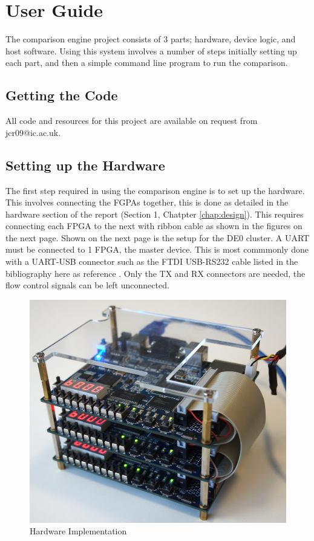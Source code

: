 \renewcommand{\baselinestretch}{1.5}
\chapter{User Guide}
\label{App:UserGuide}

The comparison engine project consists of 3 parts; hardware, device logic, and host software. Using this system involves a number of steps initially setting up each part, and then a simple command line program to run the comparison.

\section{Getting the Code}
All code and resources for this project are available on request from jcr09@ic.ac.uk.

\section{Setting up the Hardware}

The first step required in using the comparison engine is to set up the hardware. This involves connecting the FGPAs together, this is done as detailed in the hardware section of the report (Section 1, Chatpter \ref{chap:design}). This requires connecting each FPGA to the next with ribbon cable as shown in the figures on the next page. Shown on the next page is the setup for the DE0 cluster. A UART must be connected to 1 FPGA, the master device. This is most commmonly done with a UART-USB connector such as the FTDI USB-RS232 cable listed in the bibliography here as reference \cite{FTDI}. Only the TX and RX connectors are needed, the flow control signals can be left unconnected.

 
\begin{figure}[p]
  \includegraphics[width=\textwidth]{./figs/cluster.jpg}
  \caption{Hardware Implementation}
\end{figure}

